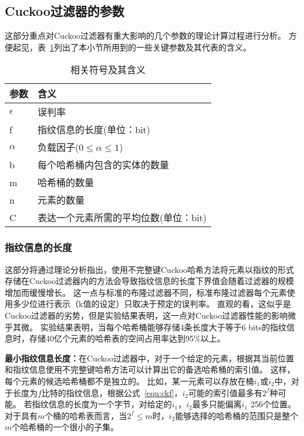 \subsection{Cuckoo过滤器的参数}
这部分重点对Cuckoo过滤器有重大影响的几个参数的理论计算过程进行分析。
方便起见，表~\ref{tab:ckf_para}列出了本小节所用到的一些关键参数及其代表的含义。
\begin{table}[htbp]
  \centering
  \caption{相关符号及其含义}
  \label{tab:ckf_para}
  \begin{tabular}{ll}
    \toprule
      参数  & 含义  \\
    \midrule
      $\epsilon$              &   误判率 \\
        f                 &   指纹信息的长度(单位：bit)\\
      $\alpha$                &   负载因子($0\leq\alpha\leq 1$) \\
      b                             &   每个哈希桶内包含的实体的数量 \\
      m                 &   哈希桶的数量 \\
      n                             &   元素的数量 \\
        C                 &   表达一个元素所需的平均位数(单位：bit)\\
    \bottomrule
  \end{tabular}
\end{table}

\subsubsection{指纹信息的长度}
这部分将通过理论分析指出，使用不完整键Cuckoo哈希方法将元素以指纹的形式存储在Cuckoo过滤器内的方法会导致指纹信息的长度下界值会随着过滤器的规模增加而缓慢增长。
这一点与标准的布隆过滤器不同，标准布隆过滤器每个元素使用多少位进行表示（k值的设定）只取决于预定的误判率。
直观的看，这似乎是Cuckoo过滤器的劣势，但是实验结果表明，这一点对Cuckoo过滤器性能的影响微乎其微。
实验结果表明，当每个哈希桶能够存储4条长度大于等于6 bits的指纹信息时，存储40亿个元素的哈希表的空间占用率达到95\%以上。

\textbf{最小指纹信息长度：}在Cuckoo过滤器中，对于一个给定的元素，根据其当前位置和指纹信息使用不完整键哈希方法可以计算出它的备选哈希桶的索引值。
这样，每个元素的候选哈希桶都不是独立的。
比如，某一元素可以存放在桶$i_1$或$i_2$中，对于长度为$f$比特的指纹信息，根据公式~\ref{equ:ckf}，$i_2$可能的索引值最多有$2^f$种可能。
若指纹信息的长度为一个字节，对给定的$i_1$，$i_2$最多只能偏离$i_1$ 256个位置。
对于具有$m$个桶的哈希表而言，当$2^f \leq m$时，$i_2$能够选择的哈希桶的范围只是整个$m$个哈希桶的一个很小的子集。

